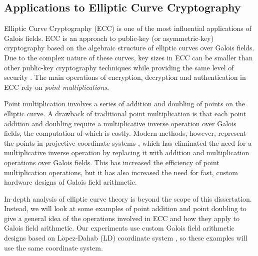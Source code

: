      
%  

\subsection{Applications to Elliptic Curve Cryptography}
Elliptic Curve Cryptography (ECC) is one of the most influential applications 
of Galois fields.
ECC is an approach to public-key (or asymmetric-key) cryptography based on the 
algebraic structure of elliptic curves over Galois fields. Due to the complex 
nature of these curves, key sizes in ECC can be smaller than other public-key
cryptography techniques while providing the same level of security \cite{ecc:book}.
The main operations of encryption, decryption and authentication in ECC 
rely on {\it point multiplications}.


Point multiplication involves a series of addition and doubling of points on the 
elliptic curve.
A drawback of traditional point multiplication is that each point addition and 
doubling require a multiplicative inverse operation over Galois fields, 
the computation of which is costly.
Modern methods, however, represent the points in 
projective coordinate systems \cite{ecc:software},
which has eliminated the need for a multiplicative inverse operation by replacing it 
with addition and multiplication operations over Galois fields.
This has increased the efficiency of point multiplication operations, but it has also
increased the need for fast, custom hardware designs of Galois field arithmetic.

In-depth analysis of elliptic curve theory is beyond the scope of this 
dissertation. Instead, we will look at some examples of point addition and point doubling to
give a general idea of the operations involved in ECC and how they apply to Galois 
field arithmetic. Our experiments use custom Galois field arithmetic designs based 
on L$\acute{o}$pez-Dahab (LD) coordinate system \cite{eccld}, so these examples will
use the same coordinate system. 

